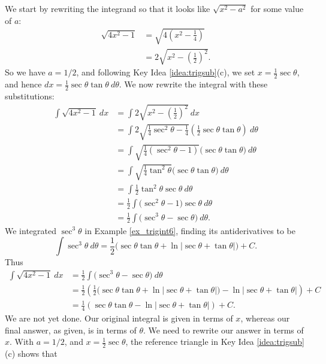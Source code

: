{We start by rewriting the integrand so that it looks like $\sqrt{x^2-a^2}$ for some value of $a$:
\begin{align*}
\sqrt{4x^2-1} &= \sqrt{4\left(x^2-\frac14\right)}\\
		&= 2\sqrt{x^2-\left(\frac12\right)^2}.
\end{align*}
So we have $a=1/2$, and following Key Idea \ref{idea:trigsub}(c), we set $x= \frac12\sec\theta$, and hence $dx = \frac12\sec\theta\tan\theta\ d\theta$. %
We now rewrite the integral with these substitutions:
\begin{align*}
\int \sqrt{4x^2-1}\ dx &= \int 2\sqrt{x^2-\left(\frac12\right)^2}\ dx\\
			&= \int 2\sqrt{\frac14\sec^2\theta - \frac14}\left(\frac12\sec\theta\tan\theta\right)\ d\theta\\
			&=\int \sqrt{\frac14(\sec^2\theta-1)}\Big(\sec\theta\tan\theta\Big)\ d\theta\\
			&=\int\sqrt{\frac14\tan^2\theta}\Big(\sec\theta\tan\theta\Big)\ d\theta\\
			&=\int \frac12\tan^2\theta\sec\theta\ d\theta\\
			&=\frac12\int \Big(\sec^2\theta-1\Big)\sec\theta\ d\theta\\
			&=\frac12\int \big(\sec^3\theta - \sec\theta\big)\ d\theta.
\end{align*}
We integrated $\sec^3\theta$ in Example \ref{ex_trigint6}, finding its antiderivatives to be
\[
\int \sec^3\theta\ d\theta = \frac12\Big(\sec \theta\tan \theta + \ln|\sec \theta+\tan \theta|\Big)+C.
\]
\enlargethispage{2\baselineskip}
Thus
\begin{align*}
\int \sqrt{4x^2-1}\ dx &=\frac12\int \big(\sec^3\theta - \sec\theta\big)\ d\theta\\
			&= \frac12\left(\frac12\Big(\sec \theta\tan \theta + \ln|\sec \theta+\tan \theta|\Big) -\ln|\sec \theta + \tan\theta|\right) + C\\
			&= \frac14\left(\sec\theta\tan\theta -\ln|\sec\theta+\tan\theta|\right)+C.
\end{align*}
We are not yet done. Our original integral is given in terms of $x$, whereas our final answer, as given, is in terms of $\theta$. We need to rewrite our answer in terms of $x$. With $a=1/2$, and $x=\frac12\sec\theta$, the reference triangle in Key Idea \ref{idea:trigsub}(c) shows that 
}
